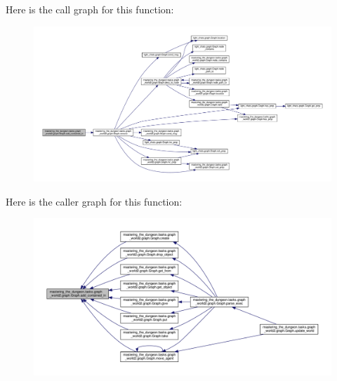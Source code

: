Here is the call graph for this function\+:
\nopagebreak
\begin{figure}[H]
\begin{center}
\leavevmode
\includegraphics[width=350pt]{classmastering__the__dungeon_1_1tasks_1_1graph__world2_1_1graph_1_1Graph_a38881cfb7d3d74d4a0cb130f946e715e_cgraph}
\end{center}
\end{figure}
Here is the caller graph for this function\+:
\nopagebreak
\begin{figure}[H]
\begin{center}
\leavevmode
\includegraphics[width=350pt]{classmastering__the__dungeon_1_1tasks_1_1graph__world2_1_1graph_1_1Graph_a38881cfb7d3d74d4a0cb130f946e715e_icgraph}
\end{center}
\end{figure}
\mbox{\label{classmastering__the__dungeon_1_1tasks_1_1graph__world2_1_1graph_1_1Graph_a78dc1fba5fc546807936ce27be6eecf9}} 
